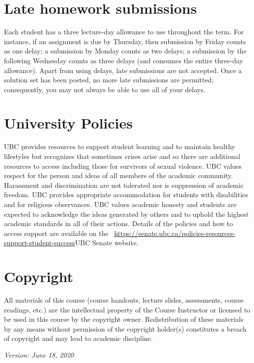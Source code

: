 \documentclass[12pt,usletter]{article} %
\begin{document}
\section*{Late homework submissions}
Each student has a three lecture-day allowance to use throughout the term. For instance, if an assignment is due by Thursday, then submission by Friday counts as one delay; a submission by Monday counts as two delays; a submission by the following Wednesday counts as three delays (and consumes the entire three-day allowance). Apart from using delays, late submissions are not accepted. Once a solution set has been posted, no more late submissions are permitted; consequently, you may not always be able to use all of your delays.



\section*{University Policies}
\color{black}
UBC provides resources to support student learning and to maintain healthy lifestyles but recognizes that sometimes crises arise and so there are additional resources to access including those for survivors of sexual violence. UBC values respect for the person and ideas of all members of the academic community. Harassment and discrimination are not tolerated nor is suppression of academic freedom. UBC provides appropriate accommodation for students with disabilities and for religious observances. UBC values academic honesty and students are expected to acknowledge the ideas generated by others and to uphold the highest academic standards in all of their actions.
Details of the policies and how to access support are available on 
the  \ \url{https://senate.ubc.ca/policies-resources-support-student-success}{UBC Senate website}.

\section*{Copyright}
\color{textblue}
All materials of this course (course handouts, lecture slides, assessments, course readings, etc.) are the intellectual property of the Course Instructor or licensed to be used in this course by the copyright owner. Redistribution of these materials by any means without permission of the copyright holder(s) constitutes a breach of copyright and may lead to academic discipline.


\par\vfill\noindent
\color{black}
\emph{Version: June 18, 2020}
\newpage
\end{document}
